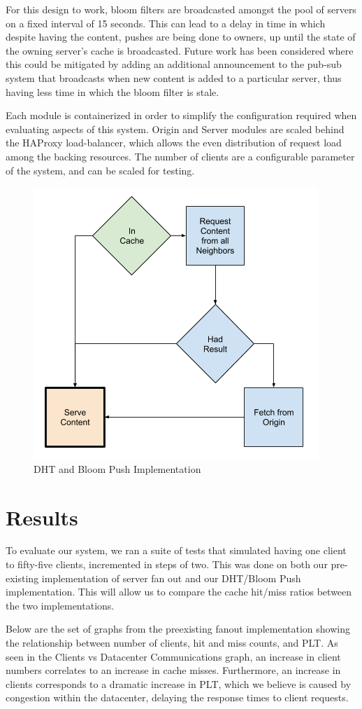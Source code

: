 \documentclass[conference]{IEEEtran}
\begin{document}
For this design to work, bloom filters are broadcasted amongst the pool of servers on a fixed interval of 15 seconds.  This can lead to a delay in time in which despite having the content, pushes are being done to owners, up until the state of the owning server’s cache is broadcasted. Future work has been considered where this could be mitigated by adding an additional announcement to the pub-sub system that broadcasts when new content is added to a particular server, thus having less time in which the bloom filter is stale.

Each module is containerized in order to simplify the configuration required when evaluating aspects of this system.  Origin and Server modules are scaled behind the HAProxy load-balancer, which allows the even distribution of request load among the backing resources. The number of clients are a configurable parameter of the system, and can be scaled for testing. 



\begin{figure}[!h]
	\centering
	\includegraphics[width=0.49\columnwidth]{figures/cache_logic_before.png}
	\caption{DHT and Bloom Push Implementation}
\end{figure}

\section{Results}\label{sec:results}
To evaluate our system, we ran a suite of tests that simulated having one client to fifty-five clients, incremented in steps of two. This was done on both our pre-existing implementation of server fan out and our DHT/Bloom Push implementation.  This will allow us to compare the cache hit/miss ratios between the two implementations.

Below are the set of graphs from the preexisting fanout implementation showing the relationship between number of clients, hit and miss counts, and PLT. As seen in the Clients vs Datacenter Communications graph, an increase in client numbers correlates to an increase in cache misses. Furthermore, an increase in clients corresponds to a dramatic increase in PLT, which we believe is caused by congestion within the datacenter, delaying the response times to client requests. 
\end{document}
